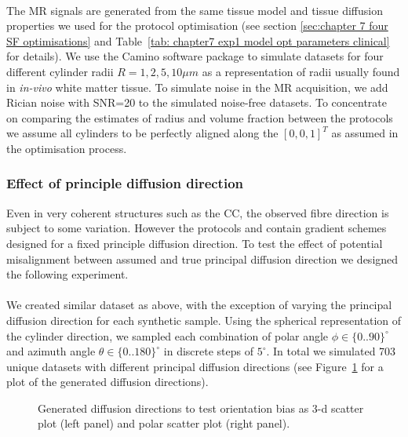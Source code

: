\paragraph{}
\label{sec: chapter 6 fibre distribution perfect}
The MR signals are generated from the same tissue model and tissue diffusion properties we used for the protocol optimisation (see section \ref{sec:chapter 7 four SF optimisations} and Table~\ref{tab: chapter7 exp1 model opt parameters clinical} for details). We use the Camino software package \citep{Cook:2006} to simulate datasets for four different cylinder radii $R={1,2,5,10}\mu m$ as a representation of radii usually found in \emph{in-vivo} white matter tissue. To simulate noise in the MR acquisition, we add Rician noise with SNR=20 to the simulated noise-free datasets. To concentrate on comparing the estimates of radius and volume fraction between the protocols we assume all cylinders to be perfectly aligned along the $[0,0,1]^T$ as assumed in the optimisation process.

\subsubsection{Effect of principle diffusion direction}
Even in very coherent structures such as the \gls{CC}, the observed fibre direction is subject to some variation. However the protocols {\FD} and {\DO} contain gradient schemes designed for a fixed principle diffusion direction. To test the effect of potential misalignment between assumed and true principal diffusion direction we designed the following experiment.
\paragraph{}
We created similar dataset as above, with the exception of varying the principal diffusion direction for each synthetic sample. Using the spherical representation of the cylinder direction, we sampled each combination of polar angle $\phi \in \{0..90\}^\circ$ and azimuth angle $\theta \in \{0..180\}^\circ$ in discrete steps of $5^\circ$. In total we simulated 703 unique datasets with different principal diffusion directions (see Figure~\ref{fig:chapter7 exp1 Ang Error dirs} for a plot of the generated diffusion directions).
\bgroup
\tikzset{use png}

\begin{figure}[h]
    \centering
	  \ifdraft
	  {
	  	\draftpic
	  }
	  {
	  	
	  }
	
        \caption{Generated diffusion directions to test orientation bias as 3-d scatter plot (left panel) and polar scatter plot (right panel).}
    \label{fig:chapter7 exp1 Ang Error dirs}
\end{figure}
\egroup

